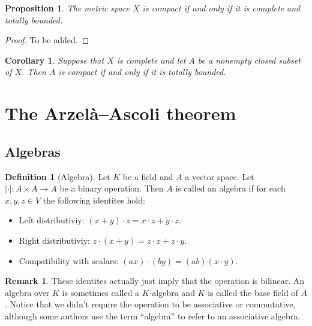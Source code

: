\documentclass[11pt,a4paper]{article}
\theoremstyle{definition}
\newtheorem{definition}{Definition}[section]
\newtheorem{remark}{Remark}[section]
\theoremstyle{plain}
\newtheorem{proposition}[theorem]{Proposition}
\newtheorem{corollary}[theorem]{Corollary}
\newcommand{\abs}[1]{\left\lvert #1\right\rvert}
\begin{document}
  \begin{proposition}
    The metric space $X$ is compact if and only if it is complete
    and totally bounded.
  \end{proposition}
  \begin{proof}
    To be added.
  \end{proof}
  
  \begin{corollary}
    Suppose that $X$ is complete and let $A$ be a nonempty closed subset
    of $X$. Then $A$ is compact if and only if it is totally bounded.
  \end{corollary}

  \newpage

  \section{The Arzelà–Ascoli theorem}\label{sec:the-AA-theorem}

  \subsection{Algebras}

  \begin{definition}[Algebra]
    Let $K$ be a field and $A$ a vector 
    space. Let $\abs{\cdot} \colon A \times A \to A$ be a binary operation.
    Then $A$ is called an algebra if for each $x,y,z \in V$ 
    the following identites hold:
    \begin{itemize}
      \item Left distributiviy: $(x + y) \cdot z = x \cdot z + y \cdot z$.
      \item Right distributiviy: $z \cdot (x + y) = z \cdot x + z \cdot y$.
      \item Compatibility with scalars: 
      $(ax) \cdot (by) = (ab) (x \cdot y)$.
    \end{itemize}
  \end{definition}
  
  \begin{remark}
    These identites actually just imply that the operation is bilinear.
    An algebra over $K$ is sometimes called a $K$-algebra and $K$ is
    called the base field of $A$. Notice that we didn't require the operation
    to be associative or commutative, although some authors use the term
    ``algebra'' to refer to an associative algebra.
  \end{remark}
\end{document}
